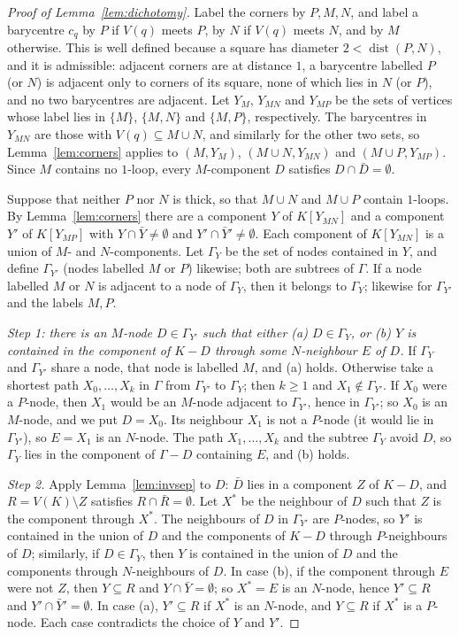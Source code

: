 \documentclass[11pt,letterpaper]{article}
\theoremstyle{definition}
\DeclareMathOperator{\dist}{dist}
\begin{document}
\begin{proof}[Proof of Lemma~\ref{lem:dichotomy}]
Label the corners by $P,M,N$, and label a barycentre $c_q$ by $P$ if $V(q)$ meets $P$, by $N$ if
$V(q)$ meets $N$, and by $M$ otherwise. This is well defined because a square has diameter
$2<\dist(P,N)$, and it is admissible: adjacent corners are at distance $1$, a barycentre labelled $P$
(or $N$) is adjacent only to corners of its square, none of which lies in $N$ (or $P$), and no two
barycentres are adjacent. Let $Y_M$, $Y_{MN}$ and $Y_{MP}$ be the sets of vertices whose label lies in
$\{M\}$, $\{M,N\}$ and $\{M,P\}$, respectively. The barycentres in $Y_{MN}$ are those with
$V(q)\subseteq M\cup N$, and similarly for the other two sets, so Lemma~\ref{lem:corners} applies to
$(M,Y_M)$, $(M\cup N,Y_{MN})$ and $(M\cup P,Y_{MP})$. Since $M$ contains no $1$-loop, every
$M$-component $D$ satisfies $D\cap\bar D=\emptyset$.

Suppose that neither $P$ nor $N$ is thick, so that $M\cup N$ and $M\cup P$ contain $1$-loops. By
Lemma~\ref{lem:corners} there are a component $Y$ of $K[Y_{MN}]$ and a component $Y'$ of
$K[Y_{MP}]$ with $Y\cap\bar Y\ne\emptyset$ and $Y'\cap\bar Y'\ne\emptyset$. Each component of
$K[Y_{MN}]$ is a union of $M$- and $N$-components. Let $\Gamma_Y$ be the set of nodes contained in
$Y$, and define $\Gamma_{Y'}$ (nodes labelled $M$ or $P$) likewise; both are subtrees of $\Gamma$. If
a node labelled $M$ or $N$ is adjacent to a node of $\Gamma_Y$, then it belongs to $\Gamma_Y$;
likewise for $\Gamma_{Y'}$ and the labels $M,P$.

\emph{Step 1: there is an $M$-node $D\in\Gamma_{Y'}$ such that either (a) $D\in\Gamma_Y$, or (b) $Y$
is contained in the component of $K-D$ through some $N$-neighbour $E$ of $D$.} If $\Gamma_Y$ and
$\Gamma_{Y'}$ share a node, that node is labelled $M$, and (a) holds. Otherwise take a shortest path
$X_0,\dots,X_k$ in $\Gamma$ from $\Gamma_{Y'}$ to $\Gamma_Y$; then $k\ge1$ and $X_1\notin\Gamma_{Y'}$.
If $X_0$ were a $P$-node, then $X_1$ would be an $M$-node adjacent to $\Gamma_{Y'}$, hence in
$\Gamma_{Y'}$; so $X_0$ is an $M$-node, and we put $D=X_0$. Its neighbour $X_1$ is not a $P$-node
(it would lie in $\Gamma_{Y'}$), so $E=X_1$ is an $N$-node. The path $X_1,\dots,X_k$ and the subtree
$\Gamma_Y$ avoid $D$, so $\Gamma_Y$ lies in the component of $\Gamma-D$ containing $E$, and (b) holds.

\emph{Step 2.} Apply Lemma~\ref{lem:invsep} to $D$: $\bar D$ lies in a component $Z$ of $K-D$, and
$R=V(K)\setminus Z$ satisfies $R\cap\bar R=\emptyset$. Let $X^*$ be the neighbour of $D$ such that
$Z$ is the component through $X^*$. The neighbours of $D$ in $\Gamma_{Y'}$ are $P$-nodes, so $Y'$ is
contained in the union of $D$ and the components of $K-D$ through $P$-neighbours of $D$; similarly,
if $D\in\Gamma_Y$, then $Y$ is contained in the union of $D$ and the components through
$N$-neighbours of $D$. In case (b), if the component through $E$ were not $Z$, then $Y\subseteq R$
and $Y\cap\bar Y=\emptyset$; so $X^*=E$ is an $N$-node, hence $Y'\subseteq R$ and
$Y'\cap\bar Y'=\emptyset$. In case (a), $Y'\subseteq R$ if $X^*$ is an $N$-node, and $Y\subseteq R$
if $X^*$ is a $P$-node. Each case contradicts the choice of $Y$ and $Y'$.
\end{proof}
\end{document}
